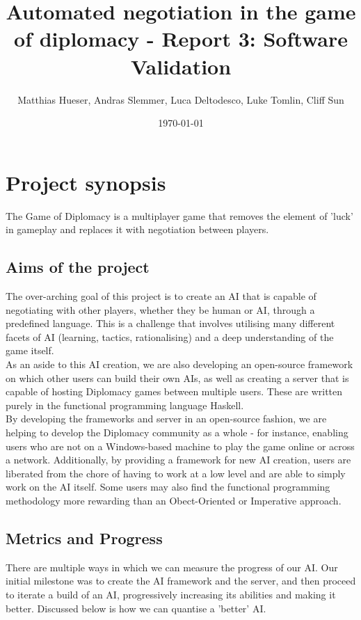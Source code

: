 \documentclass[11pt]{article}
\title{Automated negotiation in the game of diplomacy - Report 3: Software Validation}
\author{Matthias Hueser, Andras Slemmer, Luca Deltodesco, Luke Tomlin, Cliff Sun}
\date{\today}
\begin{document}
\maketitle

\section{Project synopsis}
The Game of Diplomacy is a multiplayer game that removes the element of 'luck'
in gameplay and replaces it with negotiation between players. 

\subsection{Aims of the project}
The over-arching goal of this project is to create an AI that is capable of 
negotiating with other players, whether they be human or AI, through a
predefined language. This is a challenge that involves utilising many different
facets of AI (learning, tactics, rationalising) and a deep understanding of the
game itself.
\\
As an aside to this AI creation, we are also developing an open-source framework
on which other users can build their own AIs, as well as creating a server that
is capable of hosting Diplomacy games between multiple users. These are written
purely in the functional programming language Haskell.
\\
By developing the frameworks and server in an open-source fashion, we are
helping to develop the Diplomacy community as a whole - for instance, enabling
users who are not on a Windows-based machine to play the game online or across a
network. Additionally, by providing a framework for new AI creation, users are
liberated from the chore of having to work at a low level and are able to simply
work on the AI itself. Some users may also find the functional programming
methodology more rewarding than an Obect-Oriented or Imperative approach.

\subsection{Metrics and Progress}
There are multiple ways in which we can measure the progress of our AI. Our 
initial milestone was to create the AI framework and the server, and then 
proceed to iterate a build of an AI, progressively increasing its abilities and
making it better. Discussed below is how we can quantise a 'better' AI.
\end{document}
